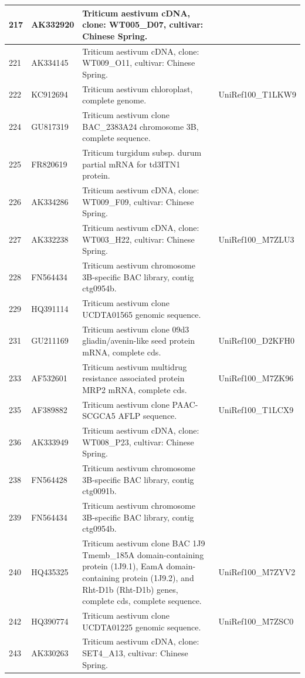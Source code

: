 \documentclass[10.9pt]{article} %
\begin{document}
{\begin{longtable}{|p{1.5cm}|p{2cm}|p{9cm}|p{3cm}|}
\hline
217 & AK332920 & Triticum aestivum cDNA, clone: WT005\_D07, cultivar: Chinese Spring. & \\
\hline
221 & AK334145 & Triticum aestivum cDNA, clone: WT009\_O11, cultivar: Chinese Spring. & \\
\hline
222 & KC912694 & Triticum aestivum chloroplast, complete genome. & UniRef100\_T1LKW9\\
\hline
224 & GU817319 & Triticum aestivum clone BAC\_2383A24 chromosome 3B, complete sequence. & \\
\hline
225 & FR820619 & Triticum turgidum subsp. durum partial mRNA for td3ITN1 protein. & \\
\hline
226 & AK334286 & Triticum aestivum cDNA, clone: WT009\_F09, cultivar: Chinese Spring. & \\
\hline
227 & AK332238 & Triticum aestivum cDNA, clone: WT003\_H22, cultivar: Chinese Spring. & UniRef100\_M7ZLU3\\
\hline
228 & FN564434 & Triticum aestivum chromosome 3B-specific BAC library, contig ctg0954b. & \\
\hline
229 & HQ391114 & Triticum aestivum clone UCDTA01565 genomic sequence. & \\
\hline
231 & GU211169 & Triticum aestivum clone 09d3 gliadin/avenin-like seed protein mRNA, complete cds. & UniRef100\_D2KFH0\\
\hline
233 & AF532601 & Triticum aestivum multidrug resistance associated protein MRP2 mRNA, complete cds. & UniRef100\_M7ZK96\\
\hline
235 & AF389882 & Triticum aestivum clone PAAC-SCGCA5 AFLP sequence. & UniRef100\_T1LCX9\\
\hline
236 & AK333949 & Triticum aestivum cDNA, clone: WT008\_P23, cultivar: Chinese Spring. & \\
\hline
238 & FN564428 & Triticum aestivum chromosome 3B-specific BAC library, contig ctg0091b. & \\
\hline
239 & FN564434 & Triticum aestivum chromosome 3B-specific BAC library, contig ctg0954b. & \\
\hline
240 & HQ435325 & Triticum aestivum clone BAC 1J9 Tmemb\_185A domain-containing protein (1J9.1), EamA domain-containing protein (1J9.2), and Rht-D1b (Rht-D1b) genes, complete cds, complete sequence. & UniRef100\_M7ZYV2\\
\hline
242 & HQ390774 & Triticum aestivum clone UCDTA01225 genomic sequence. & UniRef100\_M7ZSC0\\
\hline
243 & AK330263 & Triticum aestivum cDNA, clone: SET4\_A13, cultivar: Chinese Spring. & \\

\end{longtable}}
\end{document}
